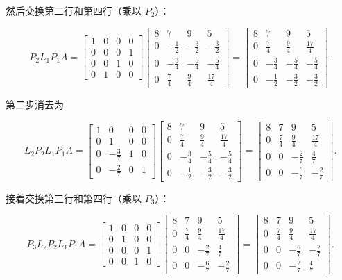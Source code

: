 \documentclass[UTF8,fontset=none,12pt]{ctexart}
\theoremstyle{definition}
\begin{document}
然后交换第二行和第四行（乘以 $P_2$）：

$$
P_2L_1P_1A=
\begin{bmatrix}
1&0&0&0\\
0&0&0&1\\
0&0&1&0\\
0&1&0&0
\end{bmatrix}
\begin{bmatrix}
8&7&9&5\\
0&-\frac12&-\frac32&-\frac32\\
0&-\frac34&-\frac54&-\frac54\\
0&\frac74&\frac94&\frac{17}4
\end{bmatrix}
=
\begin{bmatrix}
8&7&9&5\\
0&\frac74&\frac94&\frac{17}4\\
0&-\frac34&-\frac54&-\frac54\\
0&-\frac12&-\frac32&-\frac32
\end{bmatrix}.
$$

第二步消去为

$$
L_2P_2L_1P_1A=
\begin{bmatrix}
1&0&0&0\\
0&1&0&0\\
0&-\frac37&1&0\\
0&-\frac27&0&1
\end{bmatrix}
\begin{bmatrix}
8&7&9&5\\
0&\frac74&\frac94&\frac{17}4\\
0&-\frac34&-\frac54&-\frac54\\
0&-\frac12&-\frac32&-\frac32
\end{bmatrix}
=
\begin{bmatrix}
8&7&9&5\\
0&\frac74&\frac94&\frac{17}4\\
0&0&-\frac27&\frac47\\
0&0&-\frac67&-\frac27
\end{bmatrix}.
$$

接着交换第三行和第四行（乘以 $P_3$）：

$$
P_3L_2P_2L_1P_1A=
\begin{bmatrix}
1&0&0&0\\
0&1&0&0\\
0&0&0&1\\
0&0&1&0
\end{bmatrix}
\begin{bmatrix}
8&7&9&5\\
0&\frac74&\frac94&\frac{17}4\\
0&0&-\frac27&\frac47\\
0&0&-\frac67&-\frac27
\end{bmatrix}
=
\begin{bmatrix}
8&7&9&5\\
0&\frac74&\frac94&\frac{17}4\\
0&0&-\frac67&-\frac27\\
0&0&-\frac27&\frac47
\end{bmatrix}.
$$
\end{document}
